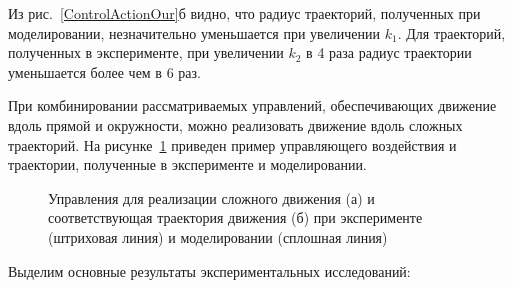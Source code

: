Из рис.~\ref{ControlActionOur}б видно, что радиус траекторий, полученных при моделировании, незначительно уменьшается при увеличении $k_1$. Для траекторий, полученных в эксперименте, при увеличении $k_2$ в 4 раза радиус траектории уменьшается более чем в 6 раз.


При комбинировании рассматриваемых управлений, обеспечивающих движение вдоль прямой и окружности, можно реализовать движение вдоль сложных траекторий. На рисунке~\ref{Slalom} приведен пример управляющего воздействия и траектории, полученные в эксперименте и моделировании.

\begin{figure}[!ht]
	\begin{minipage}[h]{0.5\linewidth}
	\end{minipage}
	\hfill
	\begin{minipage}[h]{0.5\linewidth}
	\end{minipage}
	\caption{Управления для реализации сложного движения (а) и соответствующая траектория движения (б)  при эксперименте (штриховая линия) и моделировании (сплошная линия)}
	\label{Slalom}
\end{figure}

Выделим основные результаты экспериментальных исследований:

